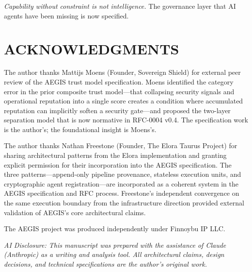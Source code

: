 \documentclass{IEEEcsmag}
\begin{document}
{\it Capability without constraint is not intelligence.} The governance layer that AI agents have been missing is now specified.

\section{ACKNOWLEDGMENTS}

The author thanks Mattijs Moens (Founder, Sovereign Shield) for external peer review of the AEGIS trust model specification. Moens identified the category error in the prior composite trust model---that collapsing security signals and operational reputation into a single score creates a condition where accumulated reputation can implicitly soften a security gate---and proposed the two-layer separation model that is now normative in RFC-0004 v0.4. The specification work is the author's; the foundational insight is Moens's.

The author thanks Nathan Freestone (Founder, The Elora Taurus Project) for sharing architectural patterns from the Elora implementation and granting explicit permission for their incorporation into the AEGIS specification. The three patterns---append-only pipeline provenance, stateless execution units, and cryptographic agent registration---are incorporated as a coherent system in the AEGIS specification and RFC process. Freestone's independent convergence on the same execution boundary from the infrastructure direction provided external validation of AEGIS's core architectural claims.

The AEGIS project was produced independently under Finnoybu IP LLC.

{\it AI Disclosure: This manuscript was prepared with the assistance of Claude (Anthropic) as a writing and analysis tool. All architectural claims, design decisions, and technical specifications are the author's original work.}
\end{document}
